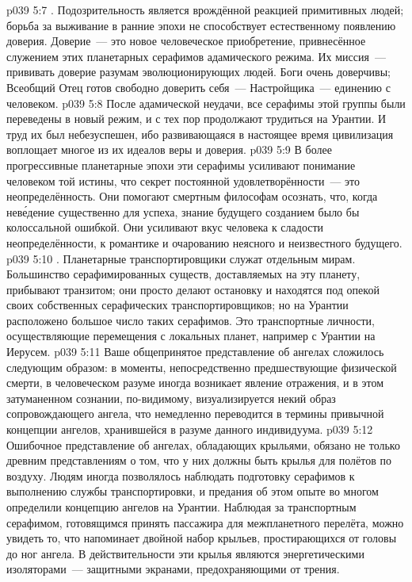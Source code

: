 \vs p039 5:7 . Подозрительность является врождённой реакцией примитивных людей; борьба за выживание в ранние эпохи не способствует естественному появлению доверия. Доверие~--- это новое человеческое приобретение, привнесённое служением этих планетарных серафимов адамического режима. Их миссия~--- прививать доверие разумам эволюционирующих людей. Боги очень доверчивы; Всеобщий Отец готов свободно доверить себя~--- Настройщика~--- единению с человеком.
\vs p039 5:8 После адамической неудачи, все серафимы этой группы были переведены в новый режим, и с тех пор продолжают трудиться на Урантии. И труд их был небезуспешен, ибо развивающаяся в настоящее время цивилизация воплощает многое из их идеалов веры и доверия.
\vs p039 5:9 В более прогрессивные планетарные эпохи эти серафимы усиливают понимание человеком той истины, что секрет постоянной удовлетворённости~--- это неопределённость. Они помогают смертным философам осознать, что, когда нев\'едение существенно для успеха, знание будущего созданием было бы колоссальной ошибкой. Они усиливают вкус человека к сладости неопределённости, к романтике и очарованию неясного и неизвестного будущего.
\vs p039 5:10 . Планетарные транспортировщики служат отдельным мирам. Большинство серафимированных существ, доставляемых на эту планету, прибывают транзитом; они просто делают остановку и находятся под опекой своих собственных серафических транспортировщиков; но на Урантии расположено большое число таких серафимов. Это транспортные личности, осуществляющие перемещения с локальных планет, например с Урантии на Иерусем.
\vs p039 5:11 \pc Ваше общепринятое представление об ангелах сложилось следующим образом: в моменты, непосредственно предшествующие физической смерти, в человеческом разуме иногда возникает явление отражения, и в этом затуманенном сознании, по\hyp{}видимому, визуализируется некий образ сопровождающего ангела, что немедленно переводится в термины привычной концепции ангелов, хранившейся в разуме данного индивидуума.
\vs p039 5:12 Ошибочное представление об ангелах, обладающих крыльями, обязано не только древним представлениям о том, что у них должны быть крылья для полётов по воздуху. Людям иногда позволялось наблюдать подготовку серафимов к выполнению службы транспортировки, и предания об этом опыте во многом определили концепцию ангелов на Урантии. Наблюдая за транспортным серафимом, готовящимся принять пассажира для межпланетного перелёта, можно увидеть то, что напоминает двойной набор крыльев, простирающихся от головы до ног ангела. В действительности эти крылья являются энергетическими изоляторами~--- защитными экранами, предохраняющими от трения.
